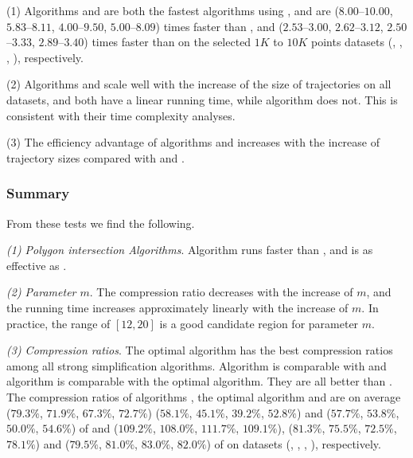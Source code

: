 
\ni(1) Algorithms \cist and \cista are both the fastest \lsa algorithms using \sed,
and are {($8.00$--$10.00$, $5.83$--$8.11$, $4.00$--$9.50$, $5.00$--$8.09$) times faster than \dps,
	and {($2.53$--$3.00$, $2.62$--$3.12$, $2.50$--$3.33$, $2.89$--$3.40$)}} times faster than \squishe on the selected $1K$ to $10K$ points datasets (\sercar,
\geolife, \mopsi, \pricar), respectively.

\ni(2) Algorithms \cist and \cista scale well with the increase of the size of trajectories on all datasets,
and both have a linear running time, while algorithm \dps does not.
This is consistent with their time complexity analyses.

\ni(3) The efficiency advantage of algorithms \cist and \cista increases with the increase of trajectory sizes compared with \dps and \squishe.


\subsubsection{Summary}
From these tests we find the following.

\sstab \emph{(1) Polygon intersection Algorithms}. Algorithm \rpia runs faster than \cpia, and is as effective as \cpia.

\sstab\emph{(2) Parameter $m$}. The compression ratio decreases with the increase of $m$, and the running time increases approximately linearly with the increase of $m$. In practice, the range of $[12, 20]$ is a good candidate region for parameter $m$.

\sstab\emph{(3) Compression ratios}. The optimal algorithm has the best compression ratios among all strong simplification algorithms. Algorithm \cist is comparable with \dps and algorithm \cista is comparable with the optimal algorithm.
They are all better than \squishe.
The compression ratios of algorithms \cist, the optimal algorithm and \cista are on average
($79.3\%$, $71.9\%$, $67.3\%$, $72.7\%$)
{($58.1\%$, $45.1\%$, $39.2\%$, $52.8\%$)} and ($57.7\%$, $53.8\%$, $50.0\%$, $54.6\%$) of \squishe
and ($109.2\%$, $108.0\%$, $111.7\%$, $109.1\%$), {($81.3\%$, $75.5\%$, $72.5\%$, $78.1\%$)} and ($79.5\%$, $81.0\%$, $83.0\%$, $82.0\%$) of \dps on {datasets} (\sercar, \geolife, \mopsi, \pricar), respectively.


